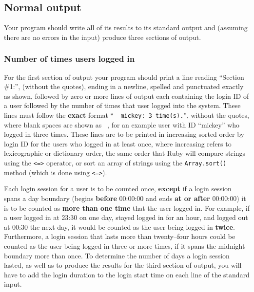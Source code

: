 \documentclass[11pt]{article}
\begin{document}
    \subsection{Normal output}

      Your program should write all of its results to its standard output and
    (assuming there are no errors in the input) produce three sections of
    output.

      \subsubsection{Number of times users logged in}

      For the first section of output your program should print a line
      reading ``Section \#1:'', (without the quotes), ending in a newline,
      spelled and punctuated exactly as shown, followed by zero or more
      lines of output each containing the login ID of a user followed by the
      number of times that user logged into the system.  These lines must
      follow the \textbf{exact} format ``\verb*@  mickey: 3 time(s).@'',
      without the quotes, where blank spaces are shown as \verb*@ @, for an
      example user with ID ``mickey'' who logged in three times.  These
      lines are to be printed in increasing sorted order by login ID for the
      users who logged in at least once, where increasing refers to
      lexicographic or dictionary order, the same order that Ruby will
      compare strings using the \texttt{<=>} operator, or sort an array of
      strings using the \texttt{Array.sort()} method (which is done using
      \texttt{<=>}).

        \enlargethispage{3mm}

        Each login session for a user is to be counted once, \textbf{except}
      if a login session spans a day boundary (begins \textbf{before}
      00:00:00 and ends \textbf{at or after} 00:00:00) it is to be counted
      as \textbf{more than one time} that the user logged in.  For example,
      if a user logged in at 23:30 on one day, stayed logged in for an hour,
      and logged out at 00:30 the next day, it would be counted as the user
      being logged in \textbf{twice}.  Furthermore, a login session that
      lasts more than twenty--four hours could be counted as the user being
      logged in three or more times, if it spans the midnight boundary more
      than once.  To determine the number of days a login session lasted, as
      well as to produce the results for the third section of output, you
      will have to add the login duration to the login start time on each
      line of the standard input.
\end{document}
